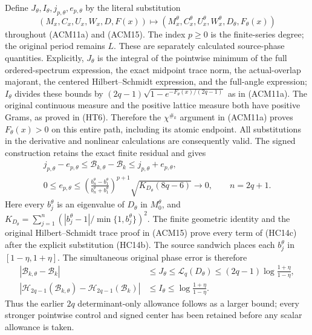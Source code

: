 Define $J_\theta,I_\theta,j_{p,\theta},e_{p,\theta}$ by the literal
substitution
\[
 (M_x,C_x,U_x,W_x,D,F(x))\longmapsto
 (M_x^\theta,C_x^\theta,U_x^\theta,W_x^\theta,D_\theta,F_\theta(x))
\]
throughout (ACM11a) and (ACM15). The index $p\geq0$ is the finite-series degree;
the original period remains $L$. These are separately calculated
source-phase quantities. Explicitly, $J_\theta$ is the integral of
the pointwise minimum of the full ordered-spectrum expression,
the exact midpoint trace norm, the actual-overlap majorant, the
centered Hilbert--Schmidt expression, and the full-angle expression;
$I_\theta$ divides these bounds by
$(2q-1)\sqrt{1-e^{-F_\theta(x)/(2q-1)}}$ as in (ACM11a).
The original continuous measure and the positive lattice measure
both have positive Grams, as proved in (HT6). Therefore the
$\chi^{\#_k}$ argument in (ACM11a) proves $F_\theta(x)>0$ on this
entire path, including its atomic endpoint. All substitutions in
the derivative and nonlinear calculations are consequently valid.
The signed construction retains the exact finite residual and gives
\[
\begin{gathered}
 j_{p,\theta}-e_{p,\theta}
 \leq\mathcal B_{k,\theta}-\mathcal B_k
 \leq j_{p,\theta}+e_{p,\theta},\\
 0\leq e_{p,\theta}\leq
 \left(\frac{b_n^\theta-b_1^\theta}{b_n^\theta+b_1^\theta}\right)^{p+1}
       \sqrt{K_{D_\theta}(8q-6)}\longrightarrow0,
 \qquad n=2q+1.
\end{gathered}
\tag{HC14c}
\]
Here every $b_j^\theta$ is an eigenvalue of $D_\theta$ in $M_0^\theta$,
and $K_{D_\theta}=\sum_{j=1}^n
(|b_j^\theta-1|/\min\{1,b_j^\theta\})^2$. The finite geometric
identity and the original Hilbert--Schmidt trace proof in (ACM15)
prove every term of (HC14c) after the explicit substitution (HC14b).
The source sandwich places each $b_j^\theta$ in $[1-\eta,1+\eta]$.
The simultaneous original phase error is therefore
\[
\begin{split}
 |\mathcal B_{k,\theta}-\mathcal B_k|
 &\leq J_\theta
 \leq\mathcal L_q(D_\theta)
 \leq(2q-1)\log\frac{1+\eta}{1-\eta},\\
 |\mathscr H_{2q-1}(\mathcal B_{k,\theta})
       -\mathscr H_{2q-1}(\mathcal B_k)|
 &\leq I_\theta\leq\log\frac{1+\eta}{1-\eta}.
\end{split}
\tag{HC14}
\]
Thus the earlier $2q$ determinant-only allowance follows as a
larger bound; every stronger pointwise control and signed center
has been retained before any scalar allowance is taken.

